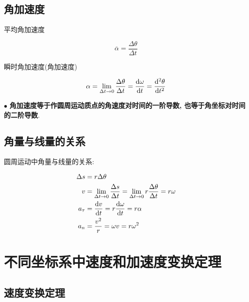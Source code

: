 \subsection{角加速度}

\begin{definition}[角加速度] \label{C1-df7}
	
	平均角加速度
	
	\begin{equation}
		\overline{\alpha} = \dfrac{\Delta \theta}{\Delta t} \label{C1-eq24}
	\end{equation}
	
	瞬时角加速度(角加速度)
	
	\begin{equation}
		\alpha = \lim\limits_{\Delta t \to 0} \dfrac{\Delta \theta}{\Delta t} = \dv{\omega}{t} = \dv[2]{\theta}{t}
		\label{C1-eq25}
	\end{equation}
	
\end{definition}

$\bullet$ \textbf{角加速度等于作圆周运动质点的角速度对时间的一阶导数, 也等于角坐标对时间的二阶导数}. 

\subsection{角量与线量的关系}

圆周运动中角量与线量的关系: 

\begin{align}
	\Delta s &= r \Delta \theta \label{C1-eq26} \\
	v &= \lim\limits_{\Delta t \to 0} \dfrac{\Delta s}{\Delta t} = \lim\limits_{\Delta t \to 0} r \dfrac{\Delta \theta}{\Delta t} = r \omega \label{C1-eq27} \\
	a_{\tau} &= \dv{v}{t} = r \dv{\omega}{t} = r \alpha \label{C1-eq28} \\
	a_n &= \dfrac{v^2}{r} = \omega v = r \omega^2
	\label{C1-eq29}
\end{align}

\section{不同坐标系中速度和加速度变换定理} \label{1.4}

\subsection{速度变换定理}

